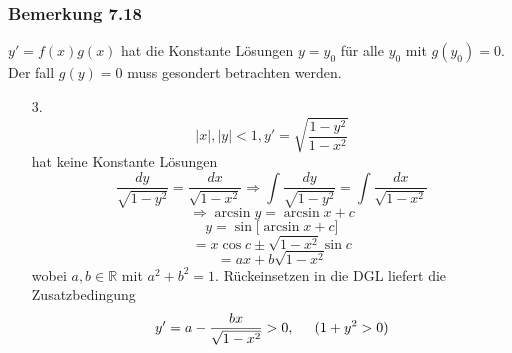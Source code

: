 \subsubsection*{Bemerkung 7.18}
$y'=f(x)g(x)$ hat die Konstante Lösungen $y=y_0$ für alle $y_0$ mit $g(y_0)=0$. Der fall $g(y)=0$ muss gesondert betrachten werden. 
\begin{enumerate}
\item[3.] $$\left| x\right|, \left| y\right|<1,y'=\sqrt{\frac{1-y^2}{1-x^2}}$$
hat keine Konstante Lösungen 
$$\frac{{dy}}{{\sqrt {1 - {y^2}} }} = \frac{{dx}}{{\sqrt {1 - {x^2}} }} \Rightarrow \int {\frac{{dy}}{{\sqrt {1 - {y^2}} }}}  = \int {\frac{{dx}}{{\sqrt {1 - {x^2}} }}} $$
$$\Rightarrow \arcsin y=\arcsin x+c$$
$$y=\sin\lbrack\arcsin x+c \rbrack$$
$$=x\cos c\pm\sqrt{1-x^2}\sin c$$
$$=ax+b\sqrt{1-x^2}$$
wobei $a,b\in\mathbb{R}$ mit $a^2+b^2=1$. Rückeinsetzen in die DGL liefert die Zusatzbedingung $$y'=a-\frac{bx}{\sqrt{1-x^2}}>0,\hspace{5mm} (1+y^2>0)$$
\end{enumerate}

















